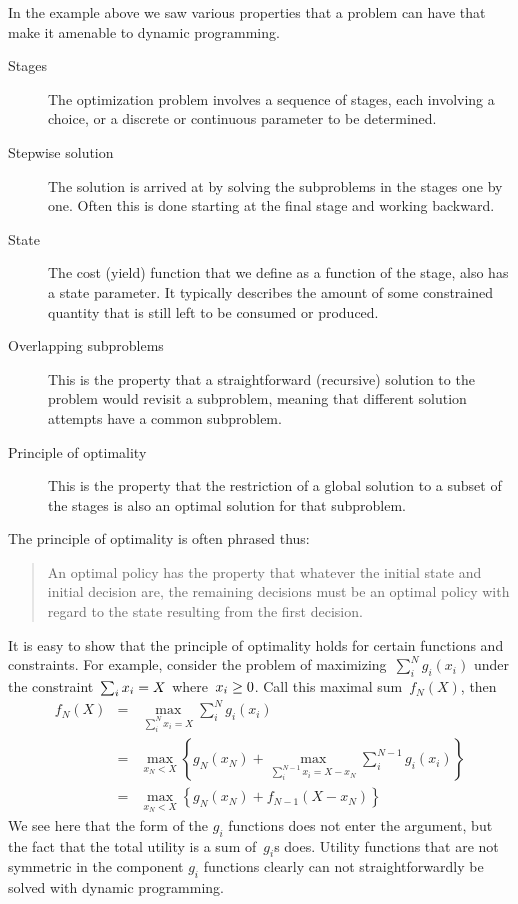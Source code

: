 In the example above we saw various properties that a problem can have
that make it amenable to dynamic programming.
\begin{description}
\item[Stages] The optimization problem involves a sequence of stages,
  each involving a choice, or a discrete or continuous parameter to be
  determined.
\item[Stepwise solution] The solution is
  arrived at by solving the subproblems in the stages one by
  one. Often this is done starting at the final stage and working backward.
\item[State] The cost (yield) function that we define as a function of
  the stage, also has a state parameter. It typically describes the
  amount of some constrained quantity that is still left to be
  consumed or produced.
\item[Overlapping subproblems] This is the property that a
  straightforward (recursive) solution to the problem would revisit a
  subproblem, meaning that different solution attempts have a common
  subproblem.
\item[Principle of optimality] This is the property that the
  restriction of a global solution to a subset of the stages is also
  an optimal solution for that subproblem.
\end{description}

The principle of optimality is often phrased thus:
\begin{quote}
An optimal policy has the property that whatever the initial state and
initial decision are, the remaining decisions must be an optimal
policy with regard to the state resulting from the first decision.
\end{quote}

It is easy to show that the principle of optimality holds for certain
functions and constraints. For example, consider the problem of
maximizing~$\sum^N_ig_i(x_i)$ under the constraint~$\sum_ix_i=\nobreak
X$ where~$x_i\geq\nobreak 0$. Call this maximal sum~$f_N(X)$, then
\begin{eqnarray*}
f_N(X)&=&\max_{\sum_i^Nx_i=X}\sum_i^Ng_i(x_i)\\
&=&\max_{x_N<X}\left\{g_N(x_N)+\max_{\sum_i^{N-1}x_i=X-x_N}\sum_i^{N-1}g_i(x_i)\right\}\\
&=&\max_{x_N<X}\left\{g_N(x_N)+f_{N-1}(X-x_N)\right\}
\end{eqnarray*}
We see here that the form of the $g_i$ functions does not enter the
argument, but the fact that the total utility is a sum of~$g_i$s does.
Utility functions that are not symmetric in the component $g_i$
functions clearly can not straightforwardly be solved with dynamic
programming.

